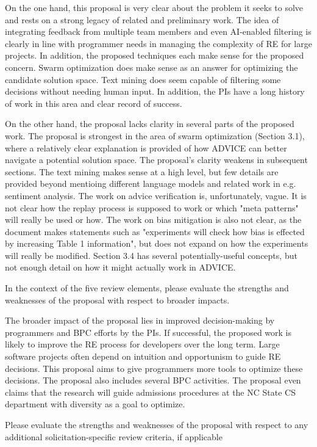 On the one hand, this proposal is very clear about the problem it seeks to solve and rests on a strong legacy of related and preliminary work. The idea of integrating feedback from multiple team members and even AI-enabled filtering is clearly in line with programmer needs in managing the complexity of RE for large projects. In addition, the proposed techniques each make sense for the proposed concern. Swarm optimization does make sense as an answer for optimizing the candidate solution space. Text mining does seem capable of filtering some decisions without needing human input. In addition, the PIs have a long history of work in this area and clear record of success.

On the other hand, the proposal lacks clarity in several parts of the proposed work. The proposal is strongest in the area of swarm optimization (Section 3.1), where a relatively clear explanation is provided of how ADVICE can better navigate a potential solution space. The proposal's clarity weakens in subsequent sections. The text mining makes sense at a high level, but few details are provided beyond mentioing different language models and related work in e.g. sentiment analysis. The work on advice verification is, unfortunately, vague. It is not clear how the replay process is supposed to work or which "meta patterns" will really be used or how. The work on bias mitigation is also not clear, as the document makes statements such as "experiments will check how bias is effected by increasing Table 1 information", but does not expand on how the experiments will really be modified. Section 3.4 has several potentially-useful concepts, but not enough detail on how it might actually work in ADVICE.

In the context of the five review elements, please
evaluate the strengths and weaknesses of the proposal with respect to broader impacts.

The broader impact of the proposal lies in improved decision-making by programmers and BPC efforts by the PIs. If successful, the proposed work is likely to improve the RE process for developers over the long term. Large software projects often depend on intuition and opportunism to guide RE decisions. This proposal aims to give programmers more tools to optimize these decisions. The proposal also includes several BPC activities. The proposal even claims that the research will guide admissions procedures at the NC State CS department with diversity as a goal to optimize.

Please evaluate the strengths and
weaknesses of the proposal with respect to any additional solicitation-specific review criteria, if
applicable



